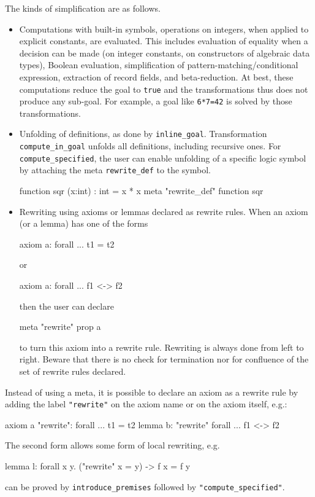The kinds of simplification are as follows.
\begin{itemize}
\item Computations with built-in symbols, \eg operations on integers,
  when applied to explicit constants, are evaluated. This includes
  evaluation of equality when a decision can be made (on integer
  constants, on constructors of algebraic data types), Boolean
  evaluation, simplification of pattern-matching/conditional expression,
  extraction of record fields, and beta-reduction.
  At best, these computations reduce the goal to
  \verb|true| and the transformations thus does not produce any sub-goal.
  For example, a goal
  like \verb|6*7=42| is solved by those transformations.
\item Unfolding of definitions, as done by \verb|inline_goal|. Transformation
  \verb|compute_in_goal| unfolds all definitions, including recursive ones.
  For \verb|compute_specified|, the user can enable unfolding of a specific
  logic symbol by attaching the meta \verb|rewrite_def| to the symbol.
\begin{whycode}
function sqr (x:int) : int = x * x
meta "rewrite_def" function sqr
\end{whycode}
\item Rewriting using axioms or lemmas declared as rewrite rules. When
  an axiom (or a lemma) has one of the forms
\begin{whycode}
axiom a: forall ... t1 = t2
\end{whycode}
  or
\begin{whycode}
axiom a: forall ... f1 <-> f2
\end{whycode}
  then the user can declare
\begin{whycode}
meta "rewrite" prop a
\end{whycode}
  to turn this axiom into a rewrite rule. Rewriting is always done
  from left to right. Beware that there is no check for termination
  nor for confluence of the set of rewrite rules declared.
\end{itemize}
Instead of using a meta, it is possible to declare an axiom as a
rewrite rule by adding the label \verb|"rewrite"| on the axiom name or
on the axiom itself, e.g.:
\begin{whycode}
axiom a "rewrite": forall ... t1 = t2
lemma b: "rewrite" forall ... f1 <-> f2
\end{whycode}
The second form allows some form of local rewriting, e.g.
\begin{whycode}
lemma l: forall x y. ("rewrite" x = y) -> f x = f y
\end{whycode}
can be proved by \verb|introduce_premises| followed by \verb|"compute_specified"|.

